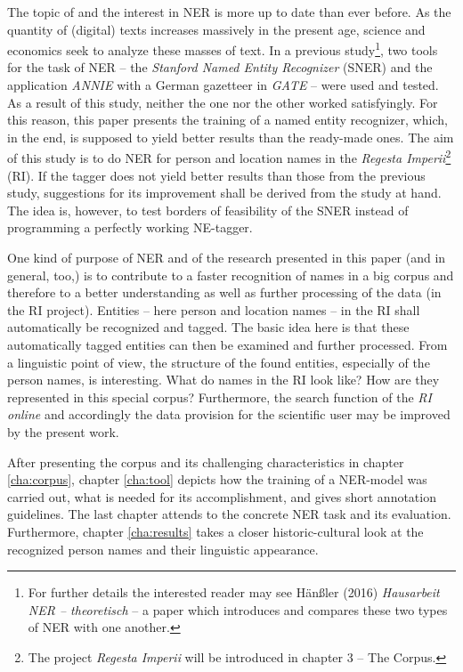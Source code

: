 \documentclass[11pt,a4paper]{article}
\begin{document}
The topic of and the interest in NER is more up to date than ever before. As the quantity of (digital) texts increases massively in the present age, science and economics seek to analyze these masses of text. In a previous study\footnote{For further details the interested reader may see H{\"a}n{\ss}ler (2016) \textit{Hausarbeit NER – theoretisch} – a paper which introduces and compares these two types of NER with one another.}, two tools for the task of NER – the \textit{Stanford Named Entity Recognizer} (SNER) and the application \textit{ANNIE} with a German gazetteer in \textit{GATE} – were used and tested. As a result of this study, neither the one nor the other worked satisfyingly. For this reason, this paper presents the training of a named entity recognizer, which, in the end, is supposed to yield better results than the ready-made ones. The aim of this study is to do NER for person and location names in the \textit{Regesta Imperii}\footnote{The project \textit{Regesta Imperii} will be introduced in chapter 3 – The Corpus.} (RI). If the tagger does not yield better results than those from the previous study, suggestions for its improvement shall be derived from the study at hand. The idea is, however, to test borders of feasibility of the SNER instead of programming a perfectly working NE-tagger.

One kind of purpose of NER and of the research presented in this paper (and in general, too,) is to contribute to a faster recognition of names in a big corpus and therefore to a better understanding as well as further processing of the data (in the RI project). Entities – here person and location names – in the RI shall automatically be recognized and tagged. The basic idea here is that these automatically tagged entities can then be examined and further processed. From a linguistic point of view, the structure of the found entities, especially of the person names, is interesting. What do names in the RI look like? How are they represented in this special corpus? Furthermore, the search function of the \textit{RI online} and accordingly the data provision for the scientific user may be improved by the present work. 

After presenting the corpus and its challenging characteristics in chapter \ref{cha:corpus}, chapter \ref{cha:tool} depicts how the training of a NER-model was carried out, what is needed for its accomplishment, and gives short annotation guidelines. The last chapter attends to the concrete NER task and its evaluation. Furthermore, chapter \ref{cha:results} takes a closer historic-cultural look at the recognized person names and their linguistic appearance.
\end{document}
